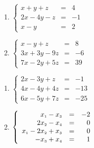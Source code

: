 \begin{multicols}{2}
\begin{enumerate}
\setcounter{enumi}{\value{HW}}


\item $\left\{ \begin{array}{rcr} x+y+z & = & 4 \\ 2x-4y-z& = & -1 \\ x-y & = & 2 \end{array} \right.$
\item $\left\{ \begin{array}{rcr} x-y+z & = & 8 \\ 3x+3y-9z & = & -6 \\  7x-2y+5z & = & 39 \end{array} \right.$

\setcounter{HW}{\value{enumi}}
\end{enumerate}
\end{multicols}


\begin{multicols}{2}
\begin{enumerate}
\setcounter{enumi}{\value{HW}}


\item $\left\{ \begin{array}{rcr} 2x-3y+z & = & -1 \\ 4x-4y+4z & = & -13 \\ 6x-5y+7z & = & -25  \end{array} \right.$

\item  $\left\{ \begin{array}{rcr} x_{\mbox{\tiny$1$}} - x_{\mbox{\tiny$3$}} & = & -2 \\ 
2x_{\mbox{\tiny$2$}} - x_{\mbox{\tiny$4$}} & = & 0  \\  
x_{\mbox{\tiny$1$}} -  2x_{\mbox{\tiny$2$}} + x_{\mbox{\tiny$3$}} & = & 0 \\
-x_{\mbox{\tiny$3$}} + x_{\mbox{\tiny$4$}} & = & 1  \end{array} \right.$ \label{solveauglast}

\setcounter{HW}{\value{enumi}}
\end{enumerate}
\end{multicols}



